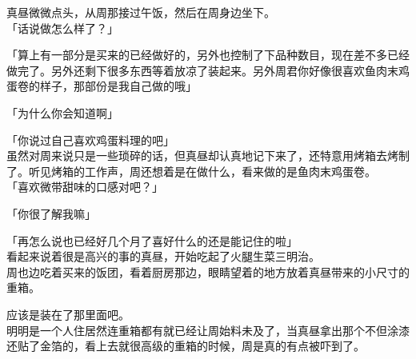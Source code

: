 真昼微微点头，从周那接过午饭，然后在周身边坐下。\\

「话说做怎么样了？」

「算上有一部分是买来的已经做好的，另外也控制了下品种数目，现在差不多已经做完了。另外还剩下很多东西等着放凉了装起来。另外周君你好像很喜欢鱼肉末鸡蛋卷的样子，那部份是我自己做的哦」

「为什么你会知道啊」

「你说过自己喜欢鸡蛋料理的吧」\\

虽然对周来说只是一些琐碎的话，但真昼却认真地记下来了，还特意用烤箱去烤制了。听见烤箱的工作声，周还想着是在做什么，看来做的是鱼肉末鸡蛋卷。\\

「喜欢微带甜味的口感对吧？」

「你很了解我嘛」

「再怎么说也已经好几个月了喜好什么的还是能记住的啦」\\

看起来说着很是高兴的事的真昼，开始吃起了火腿生菜三明治。\\

周也边吃着买来的饭团，看着厨房那边，眼睛望着的地方放着真昼带来的小尺寸的重箱。

应该是装在了那里面吧。\\

明明是一个人住居然连重箱都有就已经让周始料未及了，当真昼拿出那个不但涂漆还贴了金箔的，看上去就很高级的重箱的时候，周是真的有点被吓到了。\\


